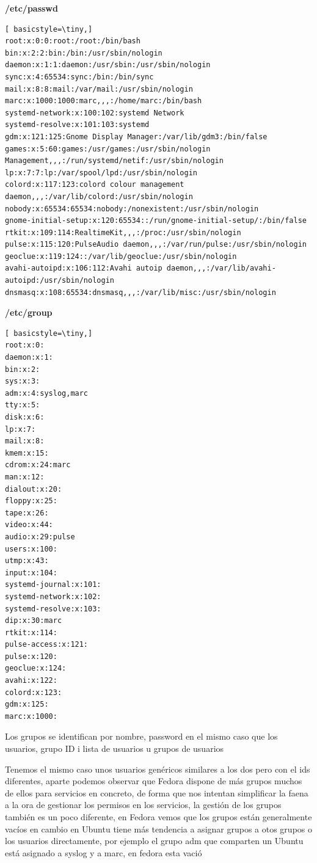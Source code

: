 \documentclass[preprint,11pt]{elsarticle}
\begin{document}
\textbf{/etc/passwd}
\begin{lstlisting}[ basicstyle=\tiny,]
root:x:0:0:root:/root:/bin/bash
bin:x:2:2:bin:/bin:/usr/sbin/nologin
daemon:x:1:1:daemon:/usr/sbin:/usr/sbin/nologin
sync:x:4:65534:sync:/bin:/bin/sync
mail:x:8:8:mail:/var/mail:/usr/sbin/nologin
marc:x:1000:1000:marc,,,:/home/marc:/bin/bash
systemd-network:x:100:102:systemd Network
systemd-resolve:x:101:103:systemd
gdm:x:121:125:Gnome Display Manager:/var/lib/gdm3:/bin/false
games:x:5:60:games:/usr/games:/usr/sbin/nologin
Management,,,:/run/systemd/netif:/usr/sbin/nologin
lp:x:7:7:lp:/var/spool/lpd:/usr/sbin/nologin
colord:x:117:123:colord colour management daemon,,,:/var/lib/colord:/usr/sbin/nologin
nobody:x:65534:65534:nobody:/nonexistent:/usr/sbin/nologin
gnome-initial-setup:x:120:65534::/run/gnome-initial-setup/:/bin/false
rtkit:x:109:114:RealtimeKit,,,:/proc:/usr/sbin/nologin
pulse:x:115:120:PulseAudio daemon,,,:/var/run/pulse:/usr/sbin/nologin
geoclue:x:119:124::/var/lib/geoclue:/usr/sbin/nologin
avahi-autoipd:x:106:112:Avahi autoip daemon,,,:/var/lib/avahi-autoipd:/usr/sbin/nologin
dnsmasq:x:108:65534:dnsmasq,,,:/var/lib/misc:/usr/sbin/nologin
\end{lstlisting}



\textbf{/etc/group}
\begin{multicols}{2}
\begin{lstlisting}[ basicstyle=\tiny,]
root:x:0:
daemon:x:1:
bin:x:2:
sys:x:3:
adm:x:4:syslog,marc
tty:x:5:
disk:x:6:
lp:x:7:
mail:x:8:
kmem:x:15:
cdrom:x:24:marc
man:x:12:
dialout:x:20:
floppy:x:25:
tape:x:26:
video:x:44:
audio:x:29:pulse
users:x:100:
utmp:x:43:
input:x:104:
systemd-journal:x:101:
systemd-network:x:102:
systemd-resolve:x:103:
dip:x:30:marc
rtkit:x:114:
pulse-access:x:121:
pulse:x:120:
geoclue:x:124:
avahi:x:122:
colord:x:123:
gdm:x:125:
marc:x:1000:
\end{lstlisting}
Los grupos se identifican por nombre, password en el mismo caso que los usuarios, grupo ID i lista de usuarios u grupos de usuarios\medskip

Tenemos el mismo caso unos usuarios genéricos similares a los dos pero con el ids diferentes, aparte podemos observar que Fedora dispone de más grupos muchos de ellos para servicios en concreto, de forma que nos intentan simplificar la faena a la ora de gestionar los permisos en los servicios, la gestión de los grupos también es un poco diferente, en Fedora vemos que los grupos están generalmente vacíos en cambio en Ubuntu tiene más tendencia a asignar grupos a otos grupos o los usuarios directamente, por ejemplo el grupo adm que comparten un Ubuntu está asignado a syslog y a marc, en fedora esta vació
\end{multicols}
\end{document}
